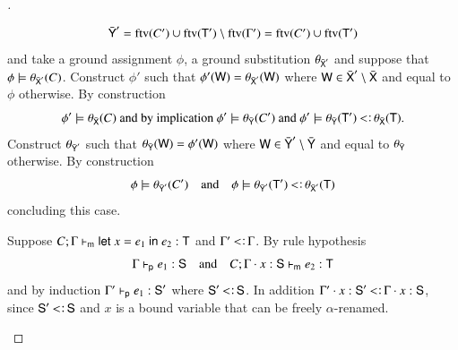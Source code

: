 \documentclass{report}
\begin{document}
\begin{proof}[]
\begin{indcase}{\sdstart}
\begin{displaymath}
\begin{array}{l}
          \bar{\textsf{Y}}' = \mathop{\rm ftv}\nolimits(C')\cup\mathop{\rm ftv}\nolimits(\textsf{T}')\setminus\mathop{\rm ftv}\nolimits(\Gamma')=\mathop{\rm ftv}\nolimits(C')\cup\mathop{\rm ftv}\nolimits(\textsf{T}')
        \end{array}
      \end{displaymath}
      and take a ground assignment $\phi$, a ground substitution $\theta_{\bar{\textsf{X}}'}$ and suppose
      that $\phi\models\theta_{\bar{\textsf{X}}'}(C)$. Construct $\phi'$ such that
      $\phi'(\textsf{W})=\theta_{\bar{\textsf{X}}'}(\textsf{W})$ where
      $\textsf{W}\in\bar{\textsf{X}}'\setminus\bar{\textsf{X}}$ and equal to $\phi$ otherwise. By construction
      \begin{displaymath}
        \phi'\csat\theta_{\bar{\type{X}}}(C)\textrm{ and by implication }
        \phi'\csat\theta_{\bar{\type{Y}}}(C')\textrm{ and }
        \phi'\csat\theta_{\bar{\type{Y}}}(\type{T}')\subtype\theta_{\bar{\type{X}}}(\type{T})\textrm{.}
      \end{displaymath}
      Construct $\theta_{\bar{\textsf{Y}}'}$ such that
      $\theta_{\bar{\textsf{Y}}}(\textsf{W})=\phi'(\textsf{W})$ where
      $\textsf{W}\in\bar{\textsf{Y}}'\setminus\bar{\textsf{Y}}$ and equal to $\theta_{\bar{\textsf{Y}}}$
      otherwise. By construction
      \begin{displaymath}
        \phi\csat\theta_{\bar{\type{Y}}'}(C')\quad\textrm{and}\quad
        \phi\csat\theta_{\bar{\type{Y}}'}(\type{T}')\subtype\theta_{\bar{\type{X}}'}(\type{T})
      \end{displaymath}
      concluding this case.
    \end{indcase}
    \begin{indcase}{\sdlet}
      Suppose $C;\Gamma\vdash_\textsf{m} \textsf{let }{x}={e_1}\textsf{ in }{e_2}:\textsf{T}$ and $\Gamma'\subtype\Gamma$.
      By rule hypothesis
      \begin{displaymath}
        \Gamma\vdash_\textsf{p} e_1:\textsf{S}\quad\textrm{and}\quad
        C;\Gamma\cdot x:\textsf{S}\vdash_\textsf{m} e_2:\textsf{T}
      \end{displaymath}
      and by induction $\Gamma'\vdash_\textsf{p} e_1:\textsf{S}'$ where $\type{S}'\subtype\type{S}$.
      In addition $\Gamma'\cdot x:\type{S}'\subtype\Gamma\cdot x:\type{S}$, since
      $\type{S}'\subtype\type{S}$ and $x$ is a bound variable that can be freely $\alpha$-renamed.

\end{indcase}
\end{proof}
\end{document}
